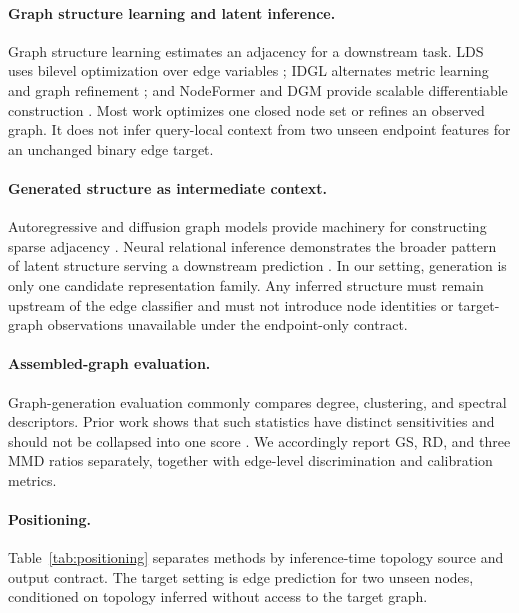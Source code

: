 \paragraph{Graph structure learning and latent inference.}
Graph structure learning estimates an adjacency for a downstream task. LDS uses
bilevel optimization over edge variables \citep{franceschi2019lds}; IDGL
alternates metric learning and graph refinement \citep{chen2020idgl}; and
NodeFormer and DGM provide scalable differentiable construction
\citep{wu2022nodeformer,kazi2023dgm}. Most work optimizes one closed node set or
refines an observed graph. It does not infer query-local context from two unseen
endpoint features for an unchanged binary edge target.

\paragraph{Generated structure as intermediate context.}
Autoregressive and diffusion graph models provide machinery for constructing
sparse adjacency \citep{you2018graphrnn,vignac2023digress}. Neural relational
inference demonstrates the broader pattern of latent structure serving a
downstream prediction \citep{kipf2018nri}. In our setting, generation is only one
candidate representation family. Any inferred structure must remain upstream of
the edge classifier and must not introduce node identities or target-graph
observations unavailable under the endpoint-only contract.

\paragraph{Assembled-graph evaluation.}
Graph-generation evaluation commonly compares degree, clustering, and spectral
descriptors. Prior work shows that such statistics have distinct sensitivities
and should not be collapsed into one score
\citep{thompson2022evaluation,obray2022evaluation}. We accordingly report GS,
RD, and three MMD ratios separately, together with edge-level discrimination and
calibration metrics.

\paragraph{Positioning.}
Table~\ref{tab:positioning} separates methods by inference-time topology source
and output contract. The target setting is edge prediction for two unseen nodes,
conditioned on topology inferred without access to the target graph.


